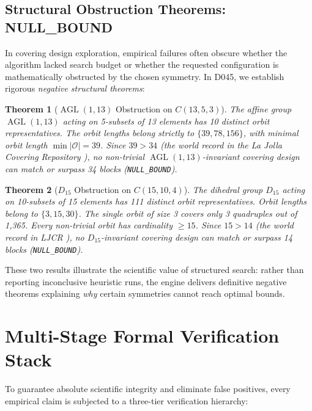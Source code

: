 \documentclass[11pt,a4paper]{article}
\newtheorem{theorem}{Theorem}[section]
\begin{document}
\subsection{Structural Obstruction Theorems: NULL\_BOUND}
\label{sec:covering_results}
In covering design exploration, empirical failures often obscure whether the algorithm lacked search budget or whether the requested configuration is mathematically obstructed by the chosen symmetry. In D045, we establish rigorous \emph{negative structural theorems}:

\begin{theorem}[$\operatorname{AGL}(1, 13)$ Obstruction on $C(13, 5, 3)$]
\label{thm:agl13}
The affine group $\operatorname{AGL}(1, 13)$ acting on 5-subsets of 13 elements has 10 distinct orbit representatives. The orbit lengths belong strictly to $\{39, 78, 156\}$, with minimal orbit length $\min |\mathcal{O}| = 39$. Since $39 > 34$ (the world record in the La Jolla Covering Repository \cite{gordon2026ljcr}), no non-trivial $\operatorname{AGL}(1, 13)$-invariant covering design can match or surpass 34 blocks (\texttt{NULL\_BOUND}).
\end{theorem}

\begin{theorem}[$D_{15}$ Obstruction on $C(15, 10, 4)$]
\label{thm:dihedral15}
The dihedral group $D_{15}$ acting on 10-subsets of 15 elements has 111 distinct orbit representatives. Orbit lengths belong to $\{3, 15, 30\}$. The single orbit of size 3 covers only 3 quadruples out of 1,365. Every non-trivial orbit has cardinality $\ge 15$. Since $15 > 14$ (the world record in LJCR \cite{gordon2026ljcr}), no $D_{15}$-invariant covering design can match or surpass 14 blocks (\texttt{NULL\_BOUND}).
\end{theorem}

These two results illustrate the scientific value of structured search: rather than reporting inconclusive heuristic runs, the engine delivers definitive negative theorems explaining \emph{why} certain symmetries cannot reach optimal bounds.

\section{Multi-Stage Formal Verification Stack}
\label{sec:verification}

To guarantee absolute scientific integrity and eliminate false positives, every empirical claim is subjected to a three-tier verification hierarchy:
\end{document}
